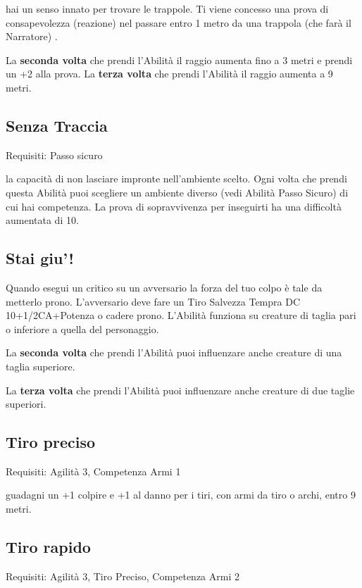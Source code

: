 \documentclass[a4paper,11pt,twoside,openany]{book}
\begin{document}
hai un senso innato per trovare le trappole. Ti viene concesso una prova di consapevolezza (reazione) nel passare entro 1 metro da una trappola (che farà il Narratore) .

La \textbf{seconda volta} che prendi l'Abilità il raggio aumenta fino a 3 metri e prendi un +2 alla prova. La \textbf{terza volta} che prendi l'Abilità il raggio aumenta a 9 metri.

\subsection{Senza Traccia}

Requisiti: Passo sicuro

la capacità di non lasciare impronte nell'ambiente scelto. Ogni volta che prendi questa Abilità puoi scegliere un ambiente diverso (vedi Abilità Passo Sicuro) di cui hai competenza. La prova di sopravvivenza per inseguirti ha una difficoltà aumentata di 10.

\subsection{Stai giu'!}

Quando esegui un critico su un avversario la forza del tuo colpo è tale da metterlo prono. L'avversario deve fare un Tiro Salvezza Tempra DC 10+1/2CA+Potenza o cadere prono. L'Abilità funziona su creature di taglia pari o inferiore a quella del personaggio.

La \textbf{seconda volta} che prendi l'Abilità puoi influenzare anche creature di una taglia superiore.

La \textbf{terza volta} che prendi l'Abilità puoi influenzare anche creature di due taglie superiori.

\subsection{Tiro preciso}

Requisiti: Agilità 3, Competenza Armi 1

guadagni un +1 colpire e +1 al danno per i tiri, con armi da tiro o archi, entro 9 metri.

\subsection{Tiro rapido}

Requisiti: Agilità 3, Tiro Preciso, Competenza Armi 2
\end{document}
